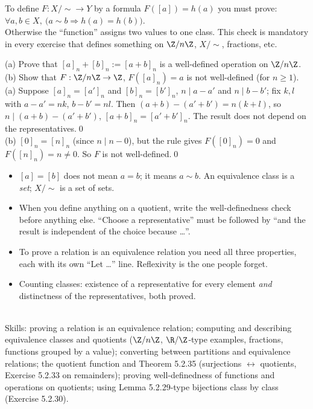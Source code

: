 \begin{key}
To define $F:X/{\sim}\to Y$ by a formula $F([a])=h(a)$ you must prove: \quad $\forall a,b\in X,\ \big(a\sim b\Rightarrow h(a)=h(b)\big)$.\\
Otherwise the ``function'' assigns two values to one class. This check is mandatory in every exercise that defines something on $\Z/n\Z$, $X/{\sim}$, fractions, etc.
\end{key}

\begin{hexample}
(a) Prove that $[a]_n+[b]_n:=[a+b]_n$ is a well-defined operation on $\Z/n\Z$.\quad (b) Show that $F:\Z/n\Z\to\Z$, $F([a]_n)=a$ is not well-defined (for $n\ge1$).
\solution
(a) Suppose $[a]_n=[a']_n$ and $[b]_n=[b']_n$, \ie $n\mid a-a'$ and $n\mid b-b'$; fix $k,l$ with $a-a'=nk$, $b-b'=nl$. Then $(a+b)-(a'+b')=n(k+l)$, so $n\mid(a+b)-(a'+b')$, \ie $[a+b]_n=[a'+b']_n$. The result does not depend on the representatives.\qed\\
(b) $[0]_n=[n]_n$ (since $n\mid n-0$), but the rule gives $F([0]_n)=0$ and $F([n]_n)=n\neq0$. So $F$ is not well-defined.\qed
\end{hexample}

\begin{warn}
\begin{itemize}
\item $[a]=[b]$ does not mean $a=b$; it means $a\sim b$. An equivalence class is a \emph{set}; $X/{\sim}$ is a set of sets.
\item When you define anything on a quotient, write the well-definedness check before anything else. ``Choose a representative'' must be followed by ``and the result is independent of the choice because \dots''.
\item To prove a relation is an equivalence relation you need all three properties, each with its own ``Let \dots'' line. Reflexivity is the one people forget.
\item Counting classes: existence of a representative for every element \emph{and} distinctness of the representatives, both proved.
\end{itemize}
\end{warn}

\begin{planning}[5.2 and 5.E]
\quad {}\\[3pt]
Skills: proving a relation is an equivalence relation; computing and describing equivalence classes and quotients ($\Z/n\Z$, $\R/\Z$-type examples, fractions, functions grouped by a value); converting between partitions and equivalence relations; the quotient function and Theorem 5.2.35 (surjections $\leftrightarrow$ quotients, Exercise 5.2.33 on remainders); proving well-definedness of functions and operations on quotients; using Lemma 5.2.29-type bijections class by class (Exercise 5.2.30).
\end{planning}

